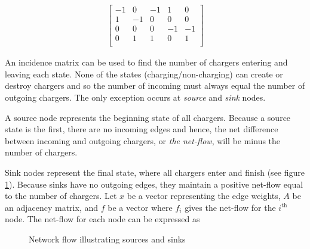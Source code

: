 \begin{align}
	\begin{bmatrix}
		-1 & 0 & -1 & 1 & 0 \\
		1 & -1 & 0 & 0 & 0 \\
		0 & 0 & 0 & -1 & -1 \\
		0 & 1 & 1 & 0 & 1 \\
	\end{bmatrix}
\end{align}
\par  An incidence matrix can be used to find the number of chargers entering and leaving each state. None of the states (charging/non-charging) can create or destroy chargers and so the number of incoming must always equal the number of outgoing chargers. The only exception occurs at \textit{source} and \textit{sink} nodes.
\par A source node represents the beginning state of all chargers.  Because a source state is the first, there are no incoming edges and hence, the net difference between incoming and outgoing chargers, or \textit{the net-flow}, will be minus the number of chargers. 
\par Sink nodes represent the final state, where all chargers enter and finish (see figure \ref{fig:sourceSink}). Because sinks have no outgoing edges, they maintain a positive net-flow equal to the number of chargers. Let $x$ be a vector representing the edge weights, $A$ be an adjacency matrix, and $f$ be a vector where $f_i$ gives the net-flow for the $i^{\text{th}}$ node. The net-flow for each node can be expressed as 

\begin{figure}
	\centering
{}
	\caption{Network flow illustrating sources and sinks}
	\label{fig:sourceSink} 
\end{figure} 

